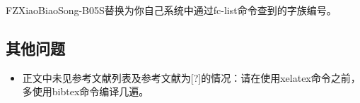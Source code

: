 \noindent FZXiaoBiaoSong-B05S替换为你自己系统中通过fc-list命令查到的字族编号。 
\subsection{其他问题}
\begin{itemize}
    \item 正文中未见参考文献列表及参考文献为[?]的情况：请在使用xelatex命令之前，多使用bibtex命令编译几遍。 
\end{itemize}
    
